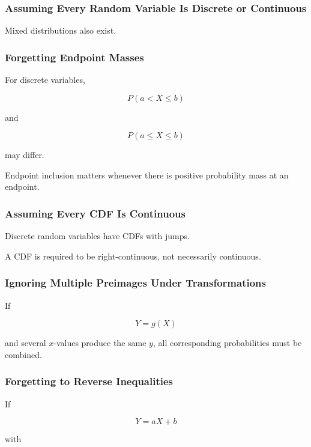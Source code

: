 \subsubsection{Assuming Every Random Variable Is Discrete or Continuous}

Mixed distributions also exist.

\subsubsection{Forgetting Endpoint Masses}

For discrete variables,

\[
P(a<X\leq b)
\]

and

\[
P(a\leq X\leq b)
\]

may differ.

Endpoint inclusion matters whenever there is positive probability mass
at an endpoint.

\subsubsection{Assuming Every CDF Is Continuous}

Discrete random variables have CDFs with jumps.

A CDF is required to be right-continuous, not necessarily continuous.

\subsubsection{Ignoring Multiple Preimages Under Transformations}

If

\[
Y=g(X)
\]

and several \(x\)-values produce the same \(y\), all corresponding
probabilities must be combined.

\subsubsection{Forgetting to Reverse Inequalities}

If

\[
Y=aX+b
\]

with

